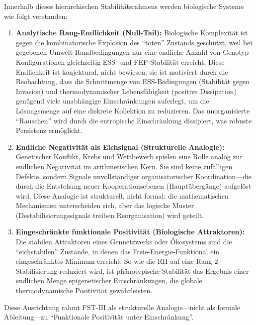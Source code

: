 \documentclass[12pt,a4paper]{article}
\theoremstyle{remark}
\begin{document}
Innerhalb dieses hierarchischen Stabilit\"atsrahmens werden biologische Systeme wie folgt verstanden:
\begin{enumerate}[label=\alph*)]
    \item \textbf{Analytische Rang-Endlichkeit (Null-Tail):} Biologische Komplexit\"at ist gegen die kombinatorische Explosion des ``toten'' Zustands gesch\"utzt, weil bei gegebenen Umwelt-Randbedingungen nur eine endliche Anzahl von Genotyp-Konfigurationen gleichzeitig ESS- und FEP-Stabilit\"at erreicht. Diese Endlichkeit ist konjektural, nicht bewiesen; sie ist motiviert durch die Beobachtung, dass die Schnittmenge von ESS-Bedingungen (Stabilit\"at gegen Invasion) und thermodynamischer Lebensfähigkeit (positive Dissipation) gen\"ugend viele unabh\"angige Einschr\"ankungen auferlegt, um die L\"osungsmenge auf eine diskrete Kollektion zu reduzieren. Das unorganisierte ``Rauschen'' wird durch die entropische Einschr\"ankung dissipiert, was robuste Persistenz erm\"oglicht.
    \item \textbf{Endliche Negativit\"at als Eichsignal (Strukturelle Analogie):} Genetischer Konflikt, Krebs und Wettbewerb spielen eine Rolle analog zur endlichen Negativit\"at im arithmetischen Kern. Sie sind keine zuf\"alligen Defekte, sondern Signale unvollst\"andiger organisatorischer Koordination---die durch die Entstehung neuer Kooperationsebenen (Haupt\"uberg\"ange) aufgel\"ost wird. Diese Analogie ist strukturell, nicht formal: die mathematischen Mechanismen unterscheiden sich, aber das logische Muster (Destabilisierungssignale treiben Reorganisation) wird geteilt.
    \item \textbf{Eingeschr\"ankte funktionale Positivit\"at (Biologische Attraktoren):} Die stabilen Attraktoren eines Gennetzwerks oder \"Okosystems sind die ``eichstabilen'' Zust\"ande, in denen das Freie-Energie-Funktional ein eingeschr\"anktes Minimum erreicht. So wie die RH auf eine Rang-2-Stabilisierung reduziert wird, ist ph\"anotypische Stabilit\"at das Ergebnis einer endlichen Menge epigenetischer Einschr\"ankungen, die globale thermodynamische Positivit\"at gew\"ahrleisten.
\end{enumerate}

Diese Ausrichtung rahmt FST-III als strukturelle Analogie---nicht als formale Ableitung---zu ``Funktionale Positivit\"at unter Einschr\"ankung''.
\end{document}
